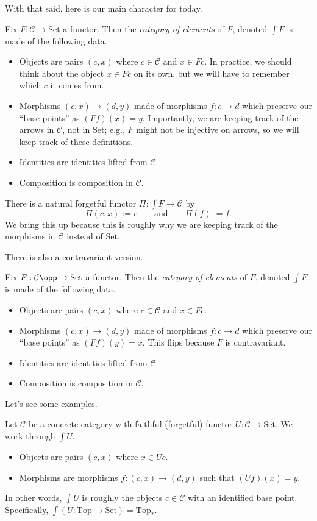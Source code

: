 \documentclass[../notes.tex]{subfiles}
\begin{document}
With that said, here is our main character for today.
\begin{definition}
	Fix $F:\mathcal C\to\mathrm{Set}$ a functor. Then the \textit{category of elements} of $F$, denoted $\int F$ is made of the following data.
	\begin{itemize}
		\item Objects are pairs $(c,x)$ where $c\in\mathcal C$ and $x\in Fc$. In practice, we should think about the object $x\in Fc$ on its own, but we will have to remember which $c$ it comes from.
		\item Morphisms $(c,x)\to(d,y)$ made of morphisms $f:c\to d$ which preserve our ``base points'' as $(Ff)(x)=y$. Importantly, we are keeping track of the arrows in $\mathcal C$, not in $\mathrm{Set}$; e.g., $F$ might not be injective on arrows, so we will keep track of these definitions.
		\item Identities are identities lifted from $\mathcal C$.
		\item Composition is composition in $\mathcal C$.
	\end{itemize}
\end{definition}
\begin{remark}
	There is a natural forgetful functor $\Pi:\int F\to\mathcal C$ by
	\[\Pi(c,x):=c\qquad\text{and}\qquad\Pi(f):=f.\]
	We bring this up because this is roughly why we are keeping track of the morphisms in $\mathcal C$ instead of $\mathrm{Set}$.
\end{remark}
There is also a contravariant version.
\begin{definition}
	Fix $F:\mathcal C\opp\to\mathrm{Set}$ a functor. Then the \textit{category of elements} of $F$, denoted $\int F$ is made of the following data.
	\begin{itemize}
		\item Objects are pairs $(c,x)$ where $c\in\mathcal C$ and $x\in Fc$.
		\item Morphisms $(c,x)\to(d,y)$ made of morphisms $f:c\to d$ which preserve our ``base points'' as $(Ff)(y)=x$. This flips because $F$ is contravariant.
		\item Identities are identities lifted from $\mathcal C$.
		\item Composition is composition in $\mathcal C$.
	\end{itemize}
\end{definition}
Let's see some examples.
\begin{example}
	Let $\mathcal C$ be a concrete category with faithful (forgetful) functor $U:\mathcal C\to\mathrm{Set}$. We work through $\int U$.
	\begin{itemize}
		\item Objects are pairs $(c,x)$ where $x\in Uc$.
		\item Morphisms are morphisms $f:(c,x)\to(d,y)$ such that $(Uf)(x)=y$.
	\end{itemize}
	In other words, $\int U$ is roughly the objects $c\in\mathcal C$ with an identified base point. Specifically, $\int (U:\mathrm{Top}\to\mathrm{Set})=\mathrm{Top}_*$.
\end{example}
\end{document}
